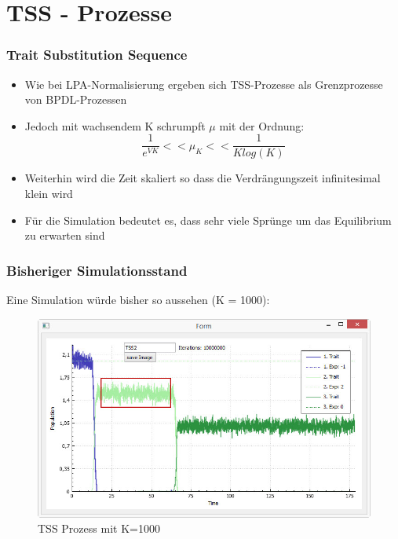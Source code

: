 \documentclass{beamer}
\begin{document}
\section{TSS - Prozesse}
	\begin{frame}
		\frametitle{Trait Substitution Sequence}
		\begin{itemize}
			\item Wie bei LPA-Normalisierung ergeben sich TSS-Prozesse als Grenzprozesse von BPDL-Prozessen
			\item Jedoch mit wachsendem K schrumpft $ \mu $ mit der Ordnung:
			\[ \frac{1}{e^{VK}} << \mu_K << \frac{1}{K log(K)} \]
			\item Weiterhin wird die Zeit skaliert so dass die Verdrängungszeit infinitesimal klein wird
			\item Für die Simulation bedeutet es, dass sehr viele Sprünge um das Equilibrium zu erwarten sind
		\end{itemize}
	\end{frame}
	\begin{frame}
		\frametitle{Bisheriger Simulationsstand}
		Eine Simulation würde bisher so aussehen (K = 1000):
		\pause
		\begin{figure}[H]
			\centering
			\includegraphics[width=0.8\linewidth]{./TSS_BPDLSimulation}
			\caption[TSS Prozess]{TSS Prozess mit K=1000}
			\label{fig:TSS_BPDLSimulation}
		\end{figure}

	\end{frame}
	
\end{document}
